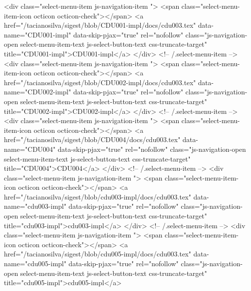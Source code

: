             <div class="select-menu-item js-navigation-item ">
              <span class="select-menu-item-icon octicon octicon-check"></span>
              <a href="/tacianosilva/sigest/blob/CDU001-impl/docs/cdu003.tex"
                 data-name="CDU001-impl"
                 data-skip-pjax="true"
                 rel="nofollow"
                 class="js-navigation-open select-menu-item-text js-select-button-text css-truncate-target"
                 title="CDU001-impl">CDU001-impl</a>
            </div> <!-- /.select-menu-item -->
            <div class="select-menu-item js-navigation-item ">
              <span class="select-menu-item-icon octicon octicon-check"></span>
              <a href="/tacianosilva/sigest/blob/CDU002-impl/docs/cdu003.tex"
                 data-name="CDU002-impl"
                 data-skip-pjax="true"
                 rel="nofollow"
                 class="js-navigation-open select-menu-item-text js-select-button-text css-truncate-target"
                 title="CDU002-impl">CDU002-impl</a>
            </div> <!-- /.select-menu-item -->
            <div class="select-menu-item js-navigation-item ">
              <span class="select-menu-item-icon octicon octicon-check"></span>
              <a href="/tacianosilva/sigest/blob/CDU004/docs/cdu003.tex"
                 data-name="CDU004"
                 data-skip-pjax="true"
                 rel="nofollow"
                 class="js-navigation-open select-menu-item-text js-select-button-text css-truncate-target"
                 title="CDU004">CDU004</a>
            </div> <!-- /.select-menu-item -->
            <div class="select-menu-item js-navigation-item ">
              <span class="select-menu-item-icon octicon octicon-check"></span>
              <a href="/tacianosilva/sigest/blob/cdu003-impl/docs/cdu003.tex"
                 data-name="cdu003-impl"
                 data-skip-pjax="true"
                 rel="nofollow"
                 class="js-navigation-open select-menu-item-text js-select-button-text css-truncate-target"
                 title="cdu003-impl">cdu003-impl</a>
            </div> <!-- /.select-menu-item -->
            <div class="select-menu-item js-navigation-item ">
              <span class="select-menu-item-icon octicon octicon-check"></span>
              <a href="/tacianosilva/sigest/blob/cdu005-impl/docs/cdu003.tex"
                 data-name="cdu005-impl"
                 data-skip-pjax="true"
                 rel="nofollow"
                 class="js-navigation-open select-menu-item-text js-select-button-text css-truncate-target"
                 title="cdu005-impl">cdu005-impl</a>

